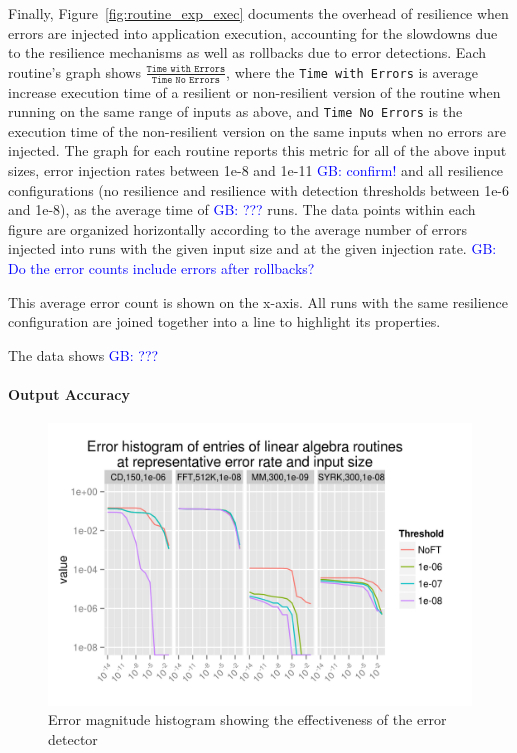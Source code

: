 \documentclass{sig-alternate}
\newcommand{\greg}[1]{%
  \textcolor{blue}{GB: #1}
}
\begin{document}
Finally, Figure~\ref{fig:routine_exp_exec} documents the overhead of resilience when errors are injected into application execution, accounting for the slowdowns due to the resilience mechanisms as well as rollbacks due to error detections.
Each routine's graph shows $\frac{\texttt{Time with Errors}}{\texttt{Time No Errors}}$, where the \texttt{Time with Errors} is average increase execution time of a resilient or non-resilient version of the routine when running on the same range of inputs as above, and \texttt{Time No Errors} is the execution time of the non-resilient version on the same inputs when no errors are injected.
The graph for each routine reports this metric for all of the above input sizes, error injection rates between 1e-8 and 1e-11 \greg{confirm!} and all resilience configurations (no resilience and resilience with detection thresholds between 1e-6 and 1e-8), as the average time of \greg{???} runs.
The data points within each figure are organized horizontally according to the average number of errors injected into runs with the given input size and at the given injection rate. \greg{Do the error counts include errors after rollbacks?}
This average error count is shown on the x-axis.
All runs with the same resilience configuration are joined together into a line to highlight its properties.

The data shows \greg{???}

\paragraph{Output Accuracy}

\begin{figure}[ht!]
\centering
\includegraphics[width=1.00\columnwidth]{figs/4_1_1_Exp2_1_Example.png}
\caption{Error magnitude histogram showing the effectiveness of the error detector}
\label{fig:algo_err_dist}
\end{figure}
\end{document}
